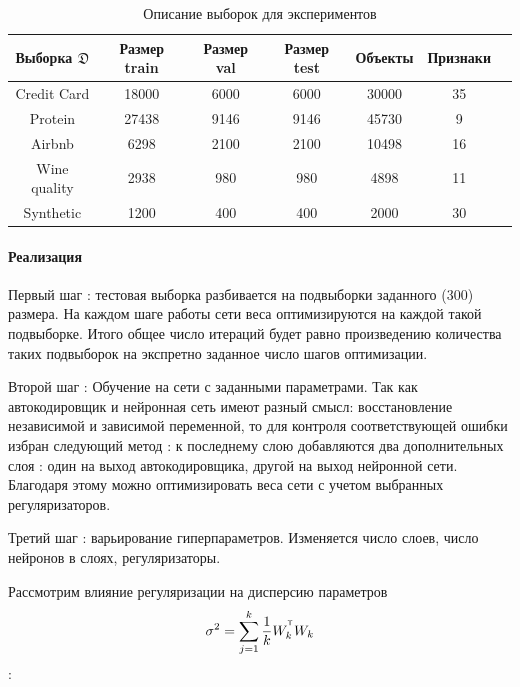 \documentclass[12pt, twoside]{article}
\newcommand{\T}{^{\text{\tiny\sffamily\upshape\mdseries T}}}
\begin{document}
\begin{table}[!htbp]
\captionsetup{justification=raggedright,singlelinecheck=false}
\label{table1}
\caption{Описание выборок для экспериментов}
\footnotesize
\begin{center}
\centering
\begin{tabular}{ | c | c | c |c | c | c | c | }
\hline
Выборка $\mathfrak{D}$ & Размер train  & Размер val  & Размер test& Объекты & Признаки\\
\hline
Credit Card & 18000 & 6000& 6000 & 30000 & 35  \\
\hline
Protein & 27438 & 9146 & 9146 & 45730 & 9 \\
\hline
Airbnb & 6298 & 2100 & 2100 & 10498 & 16 \\
\hline
Wine quality & 2938 & 980 & 980 & 4898 & 11 \\
\hline
Synthetic & 1200 & 400 & 400 & 2000 & 30 \\
\hline
\end{tabular}
\end{center}
\end{table}

\paragraph{Реализация}
Первый шаг : тестовая выборка разбивается на подвыборки заданного (300) размера. На каждом шаге работы сети веса оптимизируются на каждой такой подвыборке. Итого общее число итераций будет равно произведению количества таких подвыборок на экспретно заданное число шагов оптимизации.

Второй шаг : Обучение на сети с заданными параметрами. Так как автокодировщик и нейронная сеть имеют разный смысл: восстановление независимой и зависимой переменной, то для контроля соответствующей ошибки избран следующий метод : к последнему слою добавляются два дополнительных слоя : один на выход автокодировщика, другой на выход нейронной сети. Благодаря этому можно оптимизировать веса сети с учетом выбранных регуляризаторов.

Третий шаг : варьирование гиперпараметров. Изменяется число слоев, число нейронов в слоях, регуляризаторы.


Рассмотрим влияние регуляризации на дисперсию параметров
\[\sigma^2 = \sum\limits_{j=1}^k \frac{1}{k}W^{\T}_kW_k\]:
\newpage
\end{document}
